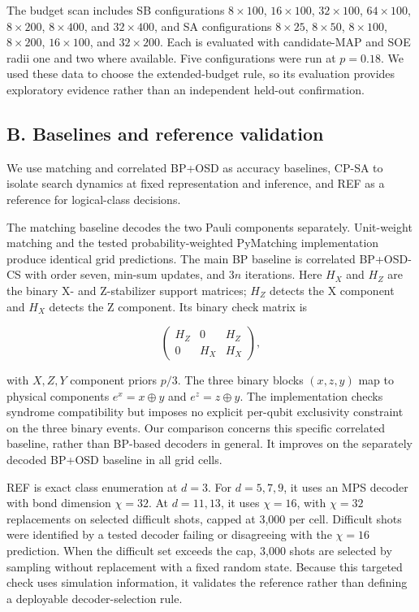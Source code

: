 \documentclass[
  10pt,
]{article}
\begin{document}
The budget scan includes SB configurations \(8\times100\),
\(16\times100\), \(32\times100\), \(64\times100\), \(8\times200\),
\(8\times400\), and \(32\times400\), and SA configurations
\(8\times25\), \(8\times50\), \(8\times100\), \(8\times200\),
\(16\times100\), and \(32\times200\). Each is evaluated with
candidate-MAP and SOE radii one and two where available. Five
configurations were run at \(p=0.18\). We used these data to choose the
extended-budget rule, so its evaluation provides exploratory evidence
rather than an independent held-out confirmation.

\subsection{B. Baselines and reference
validation}\label{b.-baselines-and-reference-validation}

We use matching and correlated BP+OSD as accuracy baselines, CP-SA to
isolate search dynamics at fixed representation and inference, and REF
as a reference for logical-class decisions.

The matching baseline decodes the two Pauli components separately.
Unit-weight matching and the tested probability-weighted PyMatching
implementation produce identical grid predictions. The main BP baseline
is correlated BP+OSD-CS with order seven, min-sum updates, and \(3n\)
iterations. Here \(H_X\) and \(H_Z\) are the binary X- and Z-stabilizer
support matrices; \(H_Z\) detects the X component and \(H_X\) detects
the Z component. Its binary check matrix is

\[
\begin{pmatrix}H_Z&0&H_Z\\0&H_X&H_X\end{pmatrix},
\tag{9}\label{eq:9}
\]

with \(X,Z,Y\) component priors \(p/3\). The three binary blocks
\((x,z,y)\) map to physical components \(e^x=x\oplus y\) and
\(e^z=z\oplus y\). The implementation checks syndrome compatibility but
imposes no explicit per-qubit exclusivity constraint on the three binary
events. Our comparison concerns this specific correlated baseline,
rather than BP-based decoders in general. It improves on the separately
decoded BP+OSD baseline in all grid cells.

REF is exact class enumeration at \(d=3\). For \(d=5,7,9\), it uses an
MPS decoder with bond dimension \(\chi=32\). At \(d=11,13\), it uses
\(\chi=16\), with \(\chi=32\) replacements on selected difficult shots,
capped at 3,000 per cell. Difficult shots were identified by a tested
decoder failing or disagreeing with the \(\chi=16\) prediction. When the
difficult set exceeds the cap, 3,000 shots are selected by sampling
without replacement with a fixed random state. Because this targeted
check uses simulation information, it validates the reference rather
than defining a deployable decoder-selection rule.
\end{document}
